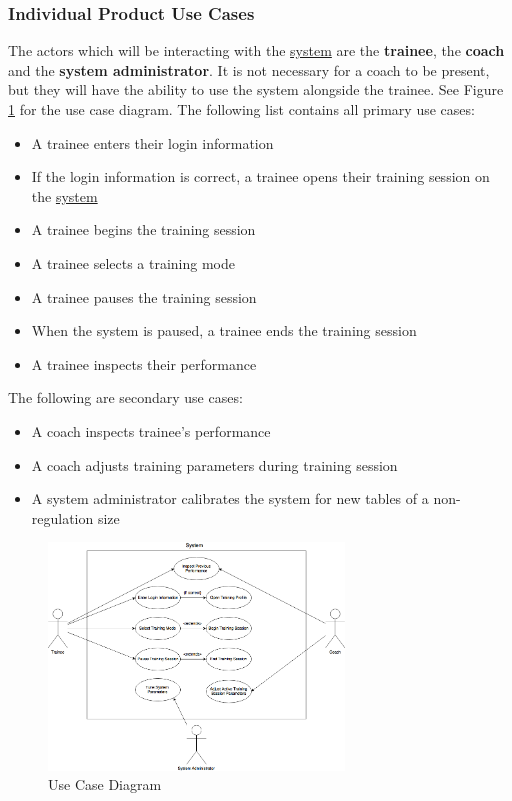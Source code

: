 \documentclass[11pt]{article}
\begin{document}
\subsubsection{Individual Product Use Cases}
The actors which will be interacting with the \hyperref[sec:definitions]{system} are the \textbf{trainee}, the \textbf{coach} and the \textbf{system administrator}. It is not necessary for a coach to be present, but they will have the ability to use the system alongside the trainee. See Figure \ref{fig:usecase} for the use case diagram. The following list contains all primary use cases:
\begin{itemize}
\item A trainee enters their login information
\item If the login information is correct, a trainee opens their training session on the \hyperref[sec:definitions]{system}
\item A trainee begins the training session
\item A trainee selects a training mode
\item A trainee pauses the training session
\item When the system is paused, a trainee ends the training session
\item A trainee inspects their performance
\end{itemize}
The following are secondary use cases:
\begin{itemize}
\item A coach inspects trainee's performance
\item A coach adjusts training parameters during training session
\item A system administrator calibrates the system for new tables of a non-regulation size
\end{itemize}

\begin{figure}[H]
   \centering
   \includegraphics[width=0.7\textwidth]{diagrams/UseCase.png}
   \caption{Use Case Diagram}
   \label{fig:usecase}
\end{figure}
\end{document}
